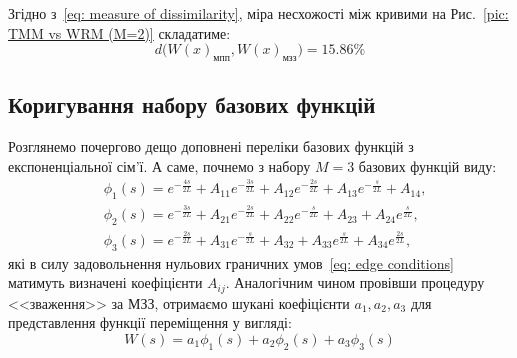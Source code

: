 \documentclass{mathreport}
\begin{document}
Згідно з~\eqref{eq: measure of dissimilarity}, міра несхожості між кривими на Рис.~\ref{pic: TMM vs WRM (M=2)} складатиме:
\begin{equation}\label{eq: measure of dissimilarity (M=2) value}
    d\bigl( W(x)_{\text{мпп}},W(x)_{\text{мзз}} \bigr) = 15.86\%
\end{equation}

\subsection*{Коригування набору базових функцій}

Розглянемо почергово дещо доповнені переліки базових функцій з експоненціальної сім'ї. А саме, почнемо з набору $M=3$ базових функцій виду:
\begin{align}
    & \phi_1(s) = e^{-\frac{4s}{2L}} + A_{11}e^{-\frac{3s}{2L}} + A_{12}e^{-\frac{2s}{2L}} + A_{13}e^{-\frac{s}{2L}} + A_{14}, \label{eq: M=3 trial phi1(x)} \\
    & \phi_2(s) = e^{-\frac{3s}{2L}} + A_{21}e^{-\frac{2s}{2L}} + A_{22}e^{-\frac{s}{2L}} + A_{23} + A_{24}e^{\frac{s}{2L}}, \label{eq: M=3 trial phi2(x)} \\
    & \phi_3(s) = e^{-\frac{2s}{2L}} + A_{31}e^{-\frac{s}{2L}} + A_{32} + A_{33}e^{\frac{s}{2L}} + A_{34}e^{\frac{2s}{2L}}, \label{eq: M=3 trial phi3(x)}
\end{align}
які в силу задовольнення нульових граничних умов~\eqref{eq: edge conditions} матимуть визначені коефіцієнти $A_{ij}$. Аналогічним чином провівши процедуру <<зваження>> за МЗЗ, отримаємо шукані коефіцієнти $a_1,a_2,a_3$ для представлення функції переміщення у вигляді: 
\begin{equation}\label{eq: W(s) M=3 approximation}
    W(s) = a_1\phi_1(s) + a_2\phi_2(s) + a_3\phi_3(s)
\end{equation}
\end{document}
